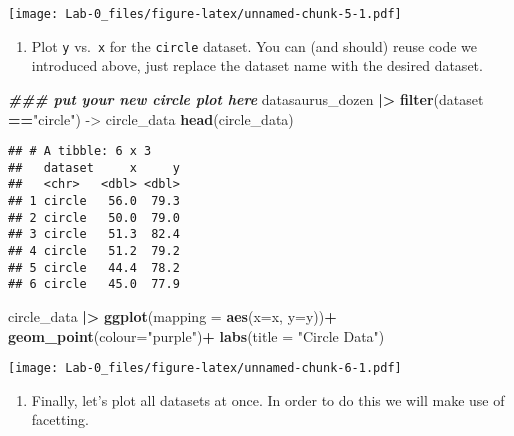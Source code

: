 \documentclass[
]{article}
\newenvironment{Shaded}{\begin{snugshade}}{\end{snugshade}}
\newcommand{\AttributeTok}[1]{\textcolor[rgb]{0.13,0.29,0.53}{#1}}
\newcommand{\DocumentationTok}[1]{\textcolor[rgb]{0.56,0.35,0.01}{\textbf{\textit{#1}}}}
\newcommand{\FunctionTok}[1]{\textcolor[rgb]{0.13,0.29,0.53}{\textbf{#1}}}
\newcommand{\NormalTok}[1]{#1}
\newcommand{\OtherTok}[1]{\textcolor[rgb]{0.56,0.35,0.01}{#1}}
\newcommand{\SpecialCharTok}[1]{\textcolor[rgb]{0.81,0.36,0.00}{\textbf{#1}}}
\newcommand{\StringTok}[1]{\textcolor[rgb]{0.31,0.60,0.02}{#1}}
\providecommand{\tightlist}{%
  \setlength{\itemsep}{0pt}\setlength{\parskip}{0pt}}
\begin{document}
\texttt{[image: Lab-0\_files/figure-latex/unnamed-chunk-5-1.pdf]}

\begin{enumerate}
\def\labelenumi{\arabic{enumi}.}
\setcounter{enumi}{2}
\tightlist
\item
  Plot \texttt{y} vs.~\texttt{x} for the \texttt{circle} dataset. You
  can (and should) reuse code we introduced above, just replace the
  dataset name with the desired dataset.
\end{enumerate}

\begin{Shaded}
\begin{Highlighting}[]
\DocumentationTok{\#\#\# put your new circle plot here}
\NormalTok{datasaurus\_dozen }\SpecialCharTok{|\textgreater{}} 
  \FunctionTok{filter}\NormalTok{(dataset }\SpecialCharTok{==}\StringTok{"circle"}\NormalTok{) }\OtherTok{{-}\textgreater{}}\NormalTok{ circle\_data}
\FunctionTok{head}\NormalTok{(circle\_data)}
\end{Highlighting}
\end{Shaded}

\begin{verbatim}
## # A tibble: 6 x 3
##   dataset     x     y
##   <chr>   <dbl> <dbl>
## 1 circle   56.0  79.3
## 2 circle   50.0  79.0
## 3 circle   51.3  82.4
## 4 circle   51.2  79.2
## 5 circle   44.4  78.2
## 6 circle   45.0  77.9
\end{verbatim}

\begin{Shaded}
\begin{Highlighting}[]
\NormalTok{circle\_data }\SpecialCharTok{|\textgreater{}} 
  \FunctionTok{ggplot}\NormalTok{(}\AttributeTok{mapping =} \FunctionTok{aes}\NormalTok{(}\AttributeTok{x=}\NormalTok{x, }\AttributeTok{y=}\NormalTok{y))}\SpecialCharTok{+}
  \FunctionTok{geom\_point}\NormalTok{(}\AttributeTok{colour=}\StringTok{"purple"}\NormalTok{)}\SpecialCharTok{+}
  \FunctionTok{labs}\NormalTok{(}\AttributeTok{title =} \StringTok{"Circle Data"}\NormalTok{)}
\end{Highlighting}
\end{Shaded}

\texttt{[image: Lab-0\_files/figure-latex/unnamed-chunk-6-1.pdf]}

\begin{enumerate}
\def\labelenumi{\arabic{enumi}.}
\setcounter{enumi}{3}
\tightlist
\item
  Finally, let's plot all datasets at once. In order to do this we will
  make use of facetting.
\end{enumerate}
\end{document}
